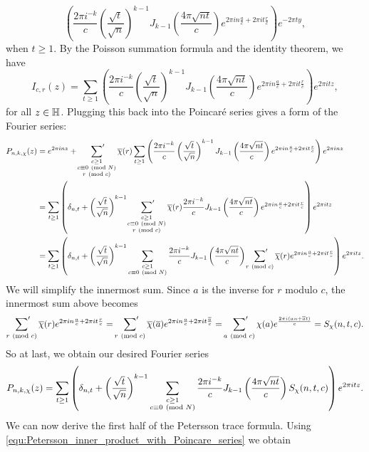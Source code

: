     \[
      \left(\frac{2\pi i^{-k}}{c}\left(\frac{\sqrt{t}}{\sqrt{n}}\right)^{k-1}J_{k-1}\left(\frac{4\pi\sqrt{nt}}{c}\right)e^{2\pi in\frac{a}{c}+2\pi it\frac{r}{c}}\right)e^{-2\pi ty},
    \]
    when $t \ge 1$. By the Poisson summation formula and the identity theorem, we have
    \[
      I_{c,r}(z) = \sum_{t \ge 1}\left(\frac{2\pi i^{-k}}{c}\left(\frac{\sqrt{t}}{\sqrt{n}}\right)^{k-1}J_{k-1}\left(\frac{4\pi\sqrt{nt}}{c}\right)e^{2\pi in\frac{a}{c}+2\pi it\frac{r}{c}}\right)e^{2\pi itz},
    \]
    for all $z \in \mathbb{H}$. Plugging this back into the Poincar\'e series gives a form of the Fourier series:
    \begin{align*}
      P_{n,k,\chi}(z) &= e^{2\pi inz}+\sideset{}{'}\sum_{\substack{c \ge 1 \\ c \equiv 0 \ \left(\text{mod }N\right) \\ r \ \left(\text{mod }c\right)}}\overline{\chi}(r)\sum_{t \ge 1}\left(\frac{2\pi i^{-k}}{c}\left(\frac{\sqrt{t}}{\sqrt{n}}\right)^{k-1}J_{k-1}\left(\frac{4\pi\sqrt{nt}}{c}\right)e^{2\pi in\frac{a}{c}+2\pi it\frac{r}{c}}\right)e^{2\pi inz} \\
      &= \sum_{t \ge 1}\left(\delta_{n,t}+\left(\frac{\sqrt{t}}{\sqrt{n}}\right)^{k-1}\sideset{}{'}\sum_{\substack{c \ge 1 \\ c \equiv 0 \ \left(\text{mod }N\right) \\ r \ \left(\text{mod }c\right)}}\overline{\chi}(r)\frac{2\pi i^{-k}}{c}J_{k-1}\left(\frac{4\pi\sqrt{nt}}{c}\right)e^{2\pi in\frac{a}{c}+2\pi it\frac{r}{c}}\right)e^{2\pi itz} \\
      &= \sum_{t \ge 1}\left(\delta_{n,t}+\left(\frac{\sqrt{t}}{\sqrt{n}}\right)^{k-1}\sum_{\substack{c \ge 1 \\ c \equiv 0 \ \left(\text{mod }N\right)}}\frac{2\pi i^{-k}}{c}J_{k-1}\left(\frac{4\pi\sqrt{nt}}{c}\right)\sideset{}{'}\sum_{r \ \left(\text{mod }c\right)}\overline{\chi}(r)e^{2\pi in\frac{a}{c}+2\pi it\frac{r}{c}}\right)e^{2\pi itz}.
    \end{align*}
    We will simplify the innermost sum. Since $a$ is the inverse for $r$ modulo $c$, the innermost sum above becomes
    \[
      \sideset{}{'}\sum_{r \ \left(\text{mod }c\right)}\overline{\chi}(r)e^{2\pi in\frac{a}{c}+2\pi it\frac{r}{c}} = \sideset{}{'}\sum_{r \ \left(\text{mod }c\right)}\overline{\chi}(\overline{a})e^{2\pi in\frac{a}{c}+2\pi it\frac{\overline{a}}{c}} = \sideset{}{'}\sum_{a \ \left(\text{mod }c\right)}\chi(a)e^{\frac{2\pi i(an+\overline{a}t)}{c}} = S_{\chi}(n,t,c).
    \]
    So at last, we obtain our desired Fourier series
    \[
      P_{n,k,\chi}(z) = \sum_{t \ge 1}\left(\delta_{n,t}+\left(\frac{\sqrt{t}}{\sqrt{n}}\right)^{k-1}\sum_{\substack{c \ge 1 \\ c \equiv 0 \ \left(\text{mod }N\right)}}\frac{2\pi i^{-k}}{c}J_{k-1}\left(\frac{4\pi\sqrt{nt}}{c}\right)S_{\chi}(n,t,c)\right)e^{2\pi itz}.
    \]
    We can now derive the first half of the Petersson trace formula. Using \cref{equ:Petersson_inner_product_with_Poincare_series} we obtain
